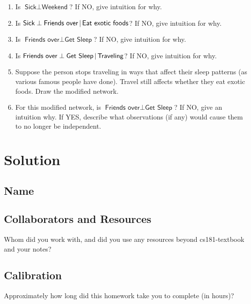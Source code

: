 \documentclass[submit]{harvardml}
\newcommand{\attr}[1]{\textsf{#1}}
\begin{document}
\begin{problem}
\begin{enumerate}
\item Is $\attr{Sick} \perp \attr{Weekend}$?
  If NO, give intuition for why.


\item Is $\attr{Sick} \perp \attr{Friends over}\given \attr{Eat exotic
  foods}$? If NO, give intuition for why.


\item Is $\attr{Friends over} \perp \attr{Get Sleep}$? If NO, give
  intuition for why.

\item Is $\attr{Friends over} \perp \attr{Get Sleep} \given
  \attr{Traveling}$? If NO, give intuition for why.

\item Suppose the person stops traveling in ways that affect their
  sleep patterns (as various famous people have done).  Travel still
  affects whether they eat exotic foods.  Draw the modified network.

\item For this modified network, is $\attr{Friends over} \perp
  \attr{Get Sleep}$? If NO, give an intuition why.  If YES,
  describe what observations (if any) would cause them to no longer be
  independent.

\end{enumerate}
\end{problem}


\section*{Solution}


\newpage
\subsection*{Name}

\subsection*{Collaborators and Resources}
Whom did you work with, and did you use any resources beyond cs181-textbook and your notes?

\subsection*{Calibration}
Approximately how long did this homework take you to complete (in hours)? 
\end{document}
